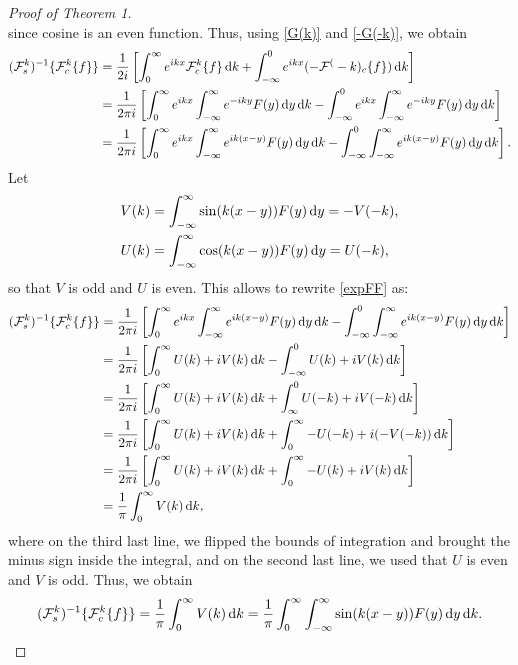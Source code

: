 \documentclass[10pt,reqno,oneside,a4paper, landscape]{article}
\begin{document}
\begin{proof}[Proof of Theorem 1]
\begin{equation}
\end{equation}
since cosine is an even function. Thus, using \eqref{G(k)} and \eqref{-G(-k)}, we obtain
\begin{align}
(\mathcal{F}^k_s)^{-1} \{ \mathcal{F}^k_c \{ f \} \} &= \frac{1}{2i} \left[ \int^{\infty}_0 e^{ikx} \mathcal{F}^k_c \{ f \} \,\mathrm{d} k + \int_{-\infty}^0 e^{ikx} (-\mathcal{F}^(-k)_c \{ f \}) \,\mathrm{d} k\right] \nonumber \\
&= \frac{1}{2\pi i} \left[ \int^{\infty}_0 e^{ikx}  \int_{-\infty}^\infty e^{-iky} F(y) \,\mathrm{d} y \,\mathrm{d} k - \int_{-\infty}^0 e^{ikx} \int_{-\infty}^\infty e^{-iky} F(y) \,\mathrm{d} y \,\mathrm{d} k\right] \nonumber \\
&= \frac{1}{2\pi i} \left[ \int^{\infty}_0 e^{ikx} \int_{-\infty}^\infty e^{ik(x-y)} F(y) \,\mathrm{d} y \,\mathrm{d} k - \int_{-\infty}^0 \int_{-\infty}^\infty e^{ik(x-y)} F(y) \,\mathrm{d} y \,\mathrm{d} k\right]. \label{expFF}
\end{align}
Let
\begin{align*}
V(k) &= \int_{-\infty}^\infty \sin(k(x-y)) F(y) \,\mathrm{d} y = -V(-k), \\
U(k) &= \int_{-\infty}^\infty \cos(k(x-y)) F(y) \,\mathrm{d} y = U(-k),
\end{align*}
so that $V$ is odd and $U$ is even. This allows to rewrite \eqref{expFF} as:
\begin{align*}
(\mathcal{F}^k_s)^{-1} \{ \mathcal{F}^k_c \{ f \} \} &= \frac{1}{2\pi i} \left[ \int^{\infty}_0 e^{ikx} \int_{-\infty}^\infty e^{ik(x-y)} F(y) \,\mathrm{d} y \,\mathrm{d} k - \int_{-\infty}^0 \int_{-\infty}^\infty e^{ik(x-y)} F(y) \,\mathrm{d} y \,\mathrm{d} k\right] \\
&= \frac{1}{2\pi i} \left[ \int^{\infty}_0 U(k) +i V(k) \,\mathrm{d} k - \int_{-\infty}^0 U(k) + i V(k) \,\mathrm{d} k\right] \\
&= \frac{1}{2\pi i} \left[ \int^{\infty}_0 U(k) +i V(k) \,\mathrm{d} k + \int_{\infty}^0 U(-k) + i V(-k) \,\mathrm{d} k\right] \\
&= \frac{1}{2\pi i} \left[ \int^{\infty}_0 U(k) +i V(k) \,\mathrm{d} k + \int^{\infty}_0 -U(-k) + i (-V(-k)) \,\mathrm{d} k\right] \\
&= \frac{1}{2\pi i} \left[ \int^{\infty}_0 U(k) +i V(k) \,\mathrm{d} k + \int^{\infty}_0 -U(k) + i V(k) \,\mathrm{d} k\right] \\
&= \frac{1}{\pi } \int^{\infty}_0 V(k) \,\mathrm{d} k,
\end{align*}
where on the third last line, we flipped the bounds of integration and brought the minus sign inside the integral, and on the second last line, we used that $U$ is even and $V$ is odd. Thus, we obtain 
\[ 
(\mathcal{F}^k_s)^{-1} \{ \mathcal{F}^k_c \{ f \} \} = \frac{1}{\pi } \int^{\infty}_0 V(k) \,\mathrm{d} k =  \frac{1}{\pi} \int^{\infty}_0 \int_{-\infty}^\infty \sin(k(x-y)) F(y) \,\mathrm{d} y \,\mathrm{d} k.
\]
\end{proof}
\end{document}
